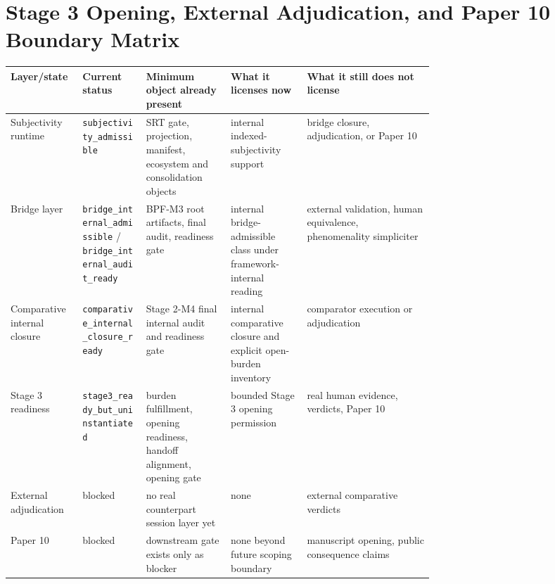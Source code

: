 \documentclass[11pt,a4paper]{article}
\theoremstyle{definition}
\begin{document}
\section{Stage 3 Opening, External Adjudication, and Paper 10 Boundary Matrix}
\begin{center}
\small
\begin{tabularx}{\linewidth}{@{}p{0.17\linewidth}p{0.15\linewidth}p{0.2\linewidth}p{0.18\linewidth}Y@{}}
\toprule
Layer/state & Current status & Minimum object already present & What it licenses now & What it still does not license \\
\midrule
Subjectivity runtime & \texttt{subjectivity\_admissible} & SRT gate, projection, manifest, ecosystem and consolidation objects & internal indexed-subjectivity support & bridge closure, adjudication, or Paper 10 \\
Bridge layer & \texttt{bridge\_internal\_admissible} / \texttt{bridge\_internal\_audit\_ready} & BPF-M3 root artifacts, final audit, readiness gate & internal bridge-admissible class under framework-internal reading & external validation, human equivalence, phenomenality simpliciter \\
Comparative internal closure & \texttt{comparative\_internal\_closure\_ready} & Stage 2-M4 final internal audit and readiness gate & internal comparative closure and explicit open-burden inventory & comparator execution or adjudication \\
Stage 3 readiness & \texttt{stage3\_ready\_but\_uninstantiated} & burden fulfillment, opening readiness, handoff alignment, opening gate & bounded Stage 3 opening permission & real human evidence, verdicts, Paper 10 \\
External adjudication & blocked & no real counterpart session layer yet & none & external comparative verdicts \\
Paper 10 & blocked & downstream gate exists only as blocker & none beyond future scoping boundary & manuscript opening, public consequence claims \\
\bottomrule
\end{tabularx}
\normalsize
\end{center}
\end{document}
